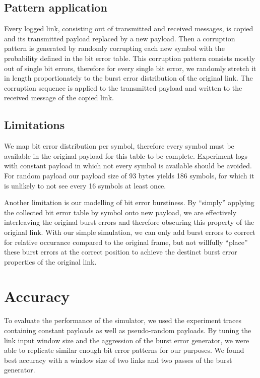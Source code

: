 \subsection{Pattern application}

Every logged link, consisting out of transmitted and received messages, is copied and its transmitted payload replaced by a new payload.
Then a corruption pattern is generated by randomly corrupting each new symbol with the probability defined in the bit error table.
This corruption pattern consists mostly out of single bit errors, therefore for every single bit error, we randomly stretch it in length proportionately to the burst error distribution of the original link.
The corruption sequence is applied to the transmitted payload and written to the received message of the copied link.

\subsection{Limitations}

We map bit error distribution per symbol, therefore every symbol must be available in the original payload for this table to be complete.
Experiment logs with constant payload in which not every symbol is available should be avoided.
For random payload our payload size of 93 bytes yields 186 symbols, for which it is unlikely to not see every 16 symbols at least once.

Another limitation is our modelling of bit error burstiness.
By ``simply'' applying the collected bit error table by symbol onto new payload, we are effectively interleaving the original burst errors and therefore obscuring this property of the original link.
With our simple simulation, we can only add burst errors to correct for relative occurance compared to the original frame, but not willfully ``place'' these burst errors at the correct position to achieve the destinct burst error properties of the original link.


\section{Accuracy}

To evaluate the performance of the simulator, we used the experiment traces containing constant payloads as well as pseudo-random payloads.
By tuning the link input window size and the aggression of the burst error generator, we were able to replicate similar enough bit error patterns for our purposes.
We found best accuracy with a window size of two links and two passes of the burst generator.

